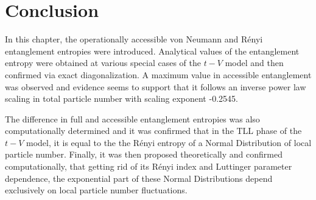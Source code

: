 \section{Conclusion}
In this chapter, the operationally accessible von Neumann and R\'enyi entanglement entropies were introduced. Analytical values of the entanglement entropy were obtained at various special cases of the $t-V$ model and then confirmed via exact diagonalization. A maximum value in accessible entanglement was observed and evidence seems to support that it follows an inverse power law scaling in total particle number with scaling exponent -0.2545. 

The difference in full and accessible entanglement entropies was also computationally determined and it was confirmed that in the TLL phase of the $t-V$ model, it is equal to the the R\'enyi entropy of a Normal Distribution of local particle number. Finally, it was then proposed theoretically and confirmed computationally, that getting rid of its R\'enyi index and Luttinger parameter dependence, the exponential part of these Normal Distributions depend exclusively on local particle number fluctuations.


